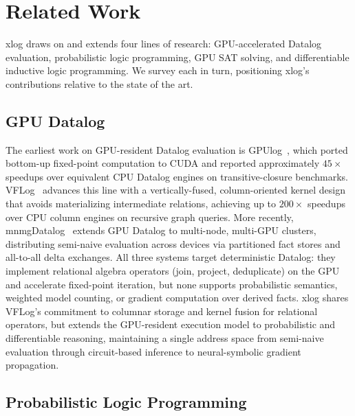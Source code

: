 \section{Related Work}\label{sec:related}

xlog draws on and extends four lines of research: GPU-accelerated Datalog evaluation, probabilistic logic programming, GPU SAT solving, and differentiable inductive logic programming. We survey each in turn, positioning xlog's contributions relative to the state of the art.

\subsection{GPU Datalog}

The earliest work on GPU-resident Datalog evaluation is GPUlog~\cite{gpulog}, which ported bottom-up fixed-point computation to CUDA and reported approximately $45\times$ speedups over equivalent CPU Datalog engines on transitive-closure benchmarks. VFLog~\cite{vflog} advances this line with a vertically-fused, column-oriented kernel design that avoids materializing intermediate relations, achieving up to $200\times$ speedups over CPU column engines on recursive graph queries. More recently, mnmgDatalog~\cite{mnmgdatalog} extends GPU Datalog to multi-node, multi-GPU clusters, distributing semi-naive evaluation across devices via partitioned fact stores and all-to-all delta exchanges. All three systems target deterministic Datalog: they implement relational algebra operators (join, project, deduplicate) on the GPU and accelerate fixed-point iteration, but none supports probabilistic semantics, weighted model counting, or gradient computation over derived facts. xlog shares VFLog's commitment to columnar storage and kernel fusion for relational operators, but extends the GPU-resident execution model to probabilistic and differentiable reasoning, maintaining a single address space from semi-naive evaluation through circuit-based inference to neural-symbolic gradient propagation.

\subsection{Probabilistic Logic Programming}

